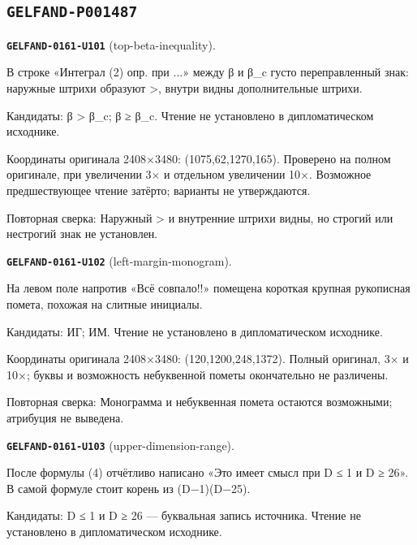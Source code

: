 \subsection*{\texttt{GELFAND-P001487}}
\par\noindent\leavevmode{}\label{GELFAND-0161-U101}\label{GELFAND-P001487:top-beta-inequality}\textbf{\texttt{GELFAND-0161-U101}} (top-beta-inequality).\nopagebreak[4]\par
В строке «Интеграл (2) опр. при ...» между β и β\_c густо переправленный знак: наружные штрихи образуют >, внутри видны дополнительные штрихи.\par
Кандидаты: β > β\_c; β ≥ β\_c. Чтение не установлено в дипломатическом исходнике.\par
Координаты оригинала 2408×3480: (1075,62,1270,165). Проверено на полном оригинале, при увеличении 3× и отдельном увеличении 10×. Возможное предшествующее чтение затёрто; варианты не утверждаются.\par
Повторная сверка: Наружный > и внутренние штрихи видны, но строгий или нестрогий знак не установлен.\par\medskip
\par\noindent\leavevmode{}\label{GELFAND-0161-U102}\label{GELFAND-P001487:left-margin-monogram}\textbf{\texttt{GELFAND-0161-U102}} (left-margin-monogram).\nopagebreak[4]\par
На левом поле напротив «Всё совпало!!» помещена короткая крупная рукописная помета, похожая на слитные инициалы.\par
Кандидаты: ИГ; ИМ. Чтение не установлено в дипломатическом исходнике.\par
Координаты оригинала 2408×3480: (120,1200,248,1372). Полный оригинал, 3× и 10×; буквы и возможность небуквенной пометы окончательно не различены.\par
Повторная сверка: Монограмма и небуквенная помета остаются возможными; атрибуция не выведена.\par\medskip
\par\noindent\leavevmode{}\label{GELFAND-0161-U103}\label{GELFAND-P001487:upper-dimension-range}\textbf{\texttt{GELFAND-0161-U103}} (upper-dimension-range).\nopagebreak[4]\par
После формулы (4) отчётливо написано «Это имеет смысл при D ≤ 1 и D ≥ 26». В самой формуле стоит корень из (D−1)(D−25).\par
Кандидаты: D ≤ 1 и D ≥ 26 — буквальная запись источника. Чтение не установлено в дипломатическом исходнике.\par
